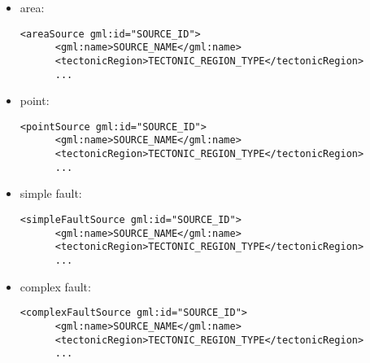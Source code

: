 \begin{itemize}
\item area:
\begin{Verbatim}[frame=single]
    <areaSource gml:id="SOURCE_ID">
      <gml:name>SOURCE_NAME</gml:name>
      <tectonicRegion>TECTONIC_REGION_TYPE</tectonicRegion>
      ...
\end{Verbatim}
\item point:
\begin{Verbatim}[frame=single]
    <pointSource gml:id="SOURCE_ID">
      <gml:name>SOURCE_NAME</gml:name>
      <tectonicRegion>TECTONIC_REGION_TYPE</tectonicRegion>
      ...
\end{Verbatim}
\item simple fault:
\begin{Verbatim}[frame=single]
    <simpleFaultSource gml:id="SOURCE_ID">
      <gml:name>SOURCE_NAME</gml:name>
      <tectonicRegion>TECTONIC_REGION_TYPE</tectonicRegion>
      ...
\end{Verbatim}
\item complex fault:
\begin{Verbatim}[frame=single]
    <complexFaultSource gml:id="SOURCE_ID">
      <gml:name>SOURCE_NAME</gml:name>
      <tectonicRegion>TECTONIC_REGION_TYPE</tectonicRegion>
      ...
\end{Verbatim}
\end{itemize}
